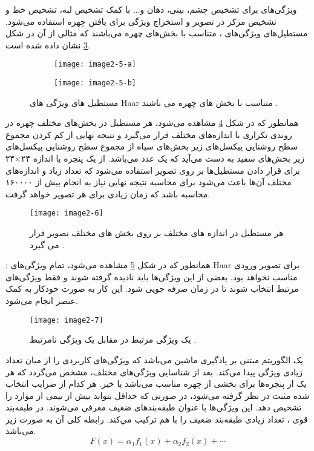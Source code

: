 \noindent
ویژگی‌های‌  برای تشخیص چشم، بینی، دهان و... با کمک تشخیص لبه، تشخیص خط و تشخیص مرکز در تصویر و استخراج ویژگی برای یافتن چهره استفاده می‌شود. مستطیل‌های ویژگی‌های ، متناسب با بخش‌های چهره می‌باشند که مثالی از آن در شکل \ref{image2-5} نشان داده شده است.

\begin{figure}
\begin{subfigure}{.5\textwidth}
  \centering
  \texttt{[image: image2-5-a]}
  \label{image2-5-a}
\end{subfigure}
\begin{subfigure}{.5\textwidth}
  \centering
  \texttt{[image: image2-5-b]}
  \label{image2-5-b}
\end{subfigure}
\caption{مستطیل های ویژگی های Haar متناسب با بخش های چهره می باشند \cite{990517}.}
\label{image2-5}
\end{figure}

\noindent
همانطور که در شکل \ref{image2-6} مشاهده می‌شود، هر مستطیل در بخش‌های مختلف چهره در روندی تکراری با اندازه‌های مختلف قرار می‌گیرد و نتیجه نهایی از کم کردن مجموع سطح روشنایی پیکسل‌های زیر بخش‌های سیاه از مجموع سطح روشنایی پیکسل‌های زیر بخش‌های سفید به دست می‌آید که یک عدد می‌باشد. از یک پنجره با اندازه ۲۴×۲۴ برای قرار دادن مستطیل‌ها بر روی تصویر استفاده می‌شود که تعداد زیاد و اندازه‌های مختلف آن‌ها باعث می‌شود برای محاسبه نتیجه نهایی نیاز به انجام بیش از ۱۶۰۰۰۰ محاسبه باشد که زمان زیادی برای هر تصویر خواهد گرفت.

\begin{figure}[h]
\centering
  \texttt{[image: image2-6]}
  \caption{هر مستطیل در اندازه های مختلف بر روی بخش های مختلف تصویر قرار می گیرد \cite{990517}.}
  \label{image2-6}
\end{figure}

\noindent
{}: 
همانطور که در شکل \ref{image2-7} مشاهده می‌شود، تمام ویژگی‌های Haar برای تصویر ورودی مناسب نخواهد بود. بعضی از این ویژگی‌ها باید نادیده گرفته شوند و فقط ویژگی‌های مرتبط انتخاب شوند تا در زمان صرفه جویی شود. این کار به صورت خودکار به کمک عنصر  انجام می‌شود.
\begin{figure}[h]
\centering
  \texttt{[image: image2-7]}
  \caption{یک ویژگی مرتبط در مقابل یک ویژگی نامرتبط \cite{990517}.}
  \label{image2-7}
\end{figure}

\noindent
{} 
یک الگوریتم مبتنی بر یادگیری ماشین می‌باشد که ویژگی‌های کاربردی را از میان تعداد زیادی ویژگی پیدا می‌کند. بعد از شناسایی ویژگی‌های مختلف، مشخص می‌گردد که هر یک از پنجره‌ها برای بخشی از چهره مناسب می‌باشد یا خیر. هر کدام از ضرایب انتخاب شده مثبت در نظر گرفته می‌شود، در صورتی که حداقل بتواند بیش از نیمی از موارد را تشخیص دهد. این ویژگی‌ها با عنوان طبقه‌بندهای ضعیف  معرفی می‌شوند. 
در طبقه‌بند قوی ، تعداد زيادی طبقه‌بند ضعيف را با هم ترکيب مي‌کند. رابطه کلی آن به صورت زیر می‌باشد.
\begin{equation}\label{eq2-5}
F(x)=\alpha_1 f_1 (x) + \alpha_2 f_2 (x) + \cdots
\end{equation}

